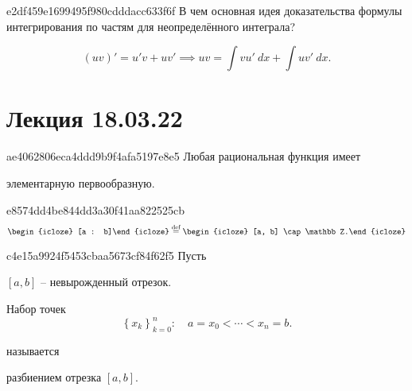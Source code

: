 
\begin{note}{e2df459e1699495f980cdddacc633f6f}
    В чем основная идея доказательства формулы интегрирования по частям для неопределённого интеграла?

    \begin{cloze}{1}
        \[
            (uv)'  = u' v + u v' \implies uv = \int v u'\: dx + \int u v'\: dx.
        \]
    \end{cloze}
\end{note}

\section{Лекция 18.03.22}
\begin{note}{ae4062806eca4ddd9b9f4afa5197e8e5}
    Любая рациональная функция имеет \begin{icloze}{1}элементарную первообразную.\end{icloze}
\end{note}

\begin{note}{e8574dd4be844dd3a30f41aa822525cb}
    \[
        \begin{icloze}{2}[a : b]\end{icloze} \overset{\text{def}}= \begin{icloze}{1}[a, b] \cap \mathbb Z.\end{icloze}
    \]
\end{note}

\begin{note}{c4e15a9924f5453cbaa5673cf84f62f5}
    Пусть \begin{icloze}{3}\( [a, b] \) -- невырожденный отрезок.\end{icloze}
    \begin{icloze}{1}Набор точек
    \[
        \left\{ x_k \right\}_{k = 0}^{n} : \quad a = x_0 < \cdots < x_n = b.
    \]\end{icloze}
    называется \begin{icloze}{2}разбиением отрезка \( [a, b] \).\end{icloze}
\end{note}

